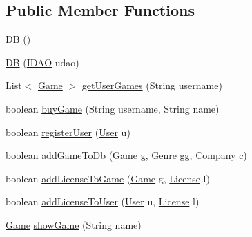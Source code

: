 \subsection*{Public Member Functions}
\begin{DoxyCompactItemize}
\item 
\hyperlink{classes_1_1deusto_1_1server_1_1db_1_1_d_b_ab53f32f36928ba9aa3ddff65fce395dc}{DB} ()
\item 
\hyperlink{classes_1_1deusto_1_1server_1_1db_1_1_d_b_abcfd35c624e742697bc2b1d1df8cc92a}{DB} (\hyperlink{interfacees_1_1deusto_1_1server_1_1db_1_1dao_1_1_i_d_a_o}{I\+D\+AO} udao)
\item 
List$<$ \hyperlink{classes_1_1deusto_1_1server_1_1db_1_1data_1_1_game}{Game} $>$ \hyperlink{classes_1_1deusto_1_1server_1_1db_1_1_d_b_a1c471589284782e7ff1190f2b6c2369e}{get\+User\+Games} (String username)
\item 
boolean \hyperlink{classes_1_1deusto_1_1server_1_1db_1_1_d_b_a8aa2e7531181a31b54850ca6665f87c2}{buy\+Game} (String username, String name)
\item 
boolean \hyperlink{classes_1_1deusto_1_1server_1_1db_1_1_d_b_a888f468b3fc2a05520fca9ac135823e3}{register\+User} (\hyperlink{classes_1_1deusto_1_1server_1_1db_1_1data_1_1_user}{User} u)
\item 
boolean \hyperlink{classes_1_1deusto_1_1server_1_1db_1_1_d_b_a376112d91f8e3018821fd9362f6598ae}{add\+Game\+To\+Db} (\hyperlink{classes_1_1deusto_1_1server_1_1db_1_1data_1_1_game}{Game} g, \hyperlink{classes_1_1deusto_1_1server_1_1db_1_1data_1_1_genre}{Genre} gg, \hyperlink{classes_1_1deusto_1_1server_1_1db_1_1data_1_1_company}{Company} c)
\item 
boolean \hyperlink{classes_1_1deusto_1_1server_1_1db_1_1_d_b_a5f4f68a9d2b7d6e8fbcc6e28136b92c8}{add\+License\+To\+Game} (\hyperlink{classes_1_1deusto_1_1server_1_1db_1_1data_1_1_game}{Game} g, \hyperlink{classes_1_1deusto_1_1server_1_1db_1_1data_1_1_license}{License} l)
\item 
boolean \hyperlink{classes_1_1deusto_1_1server_1_1db_1_1_d_b_a996d40d6b184ea0dfa3dcab05bc04757}{add\+License\+To\+User} (\hyperlink{classes_1_1deusto_1_1server_1_1db_1_1data_1_1_user}{User} u, \hyperlink{classes_1_1deusto_1_1server_1_1db_1_1data_1_1_license}{License} l)
\item 
\hyperlink{classes_1_1deusto_1_1server_1_1db_1_1data_1_1_game}{Game} \hyperlink{classes_1_1deusto_1_1server_1_1db_1_1_d_b_adba76c20f2fc7ed01d486564d881a718}{show\+Game} (String name)
\item 

\end{DoxyCompactItemize}
